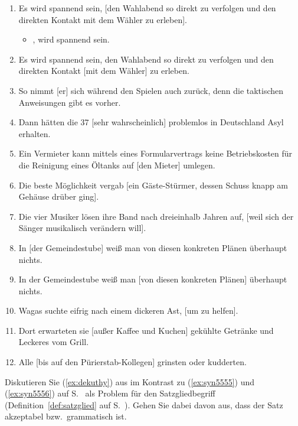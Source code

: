 \begin{enumerate}\Lf
  \item Es wird spannend sein, [den Wahlabend so direkt zu verfolgen und den direkten Kontakt mit dem Wähler zu erleben].
    \begin{itemize}
      \item {}, wird spannend sein.
    \end{itemize}
  \item Es wird spannend sein, den Wahlabend so direkt zu verfolgen und den direkten Kontakt [mit dem Wähler] zu erleben.
  \item So nimmt [er] sich während den Spielen auch zurück, denn die taktischen Anweisungen gibt es vorher.
  \item Dann hätten die 37 [sehr wahrscheinlich] problemlos in Deutschland Asyl erhalten.
  \item Ein Vermieter kann mittels eines Formularvertrags keine Betriebskosten für die Reinigung eines Öltanks auf [den Mieter] umlegen.
  \item Die beste Möglichkeit vergab [ein Gäste-Stürmer, dessen Schuss knapp am Gehäuse drüber ging].
  \item Die vier Musiker lösen ihre Band nach dreieinhalb Jahren auf, [weil sich der Sänger musikalisch verändern will].
  \item In [der Gemeindestube] weiß man von diesen konkreten Plänen überhaupt nichts.
  \item In der Gemeindestube weiß man [von diesen konkreten Plänen] überhaupt nichts.
  \item Wagas suchte eifrig nach einem dickeren Ast, [um zu helfen].
  \item Dort erwarteten sie [außer Kaffee und Kuchen] gekühlte Getränke und Leckeres vom Grill.
  \item Alle [bis auf den Pürierstab-Kollegen] grinsten oder kudderten.
\end{enumerate}

\Uebung[\tristar] \label{u103} Diskutieren Sie (\ref{ex:dekuthy}) aus \citet[1--2]{Dekuthy2002} im Kontrast zu (\ref{ex:syn5555}) und (\ref{ex:syn5556}) auf S.~\pageref{ex:syn5555} als Problem für den Satzgliedbegriff (Definition~\ref{def:satzglied} auf S.~\pageref{def:satzglied}).
Gehen Sie dabei davon aus, dass der Satz akzeptabel bzw.\ grammatisch ist.

\begin{exe}
\end{exe}
